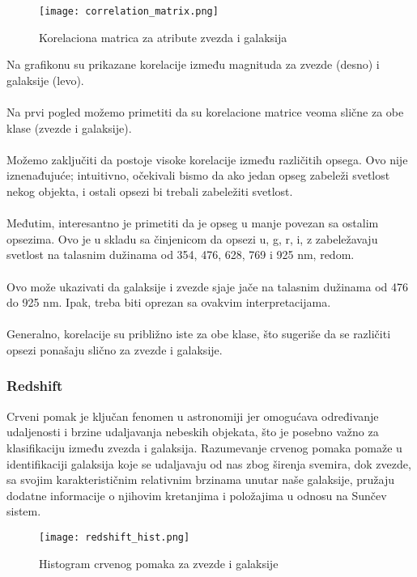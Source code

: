 \documentclass[a4paper,12pt]{article}
\begin{document}
\clearpage

\begin{figure}[h!]
\centering
\texttt{[image: correlation\_matrix.png]}
\caption{Korelaciona matrica za atribute zvezda i galaksija}
\label{fig:correlation_matrix}
\end{figure}

Na grafikonu su prikazane korelacije između magnituda za zvezde (desno) i galaksije (levo).
\\\\Na prvi pogled možemo primetiti da su korelacione matrice veoma slične za obe klase (zvezde i galaksije).
\\\\Možemo zaključiti da postoje visoke korelacije između različitih opsega. Ovo nije iznenađujuće; intuitivno, očekivali bismo da ako jedan opseg zabeleži svetlost nekog objekta, i ostali opsezi bi trebali zabeležiti svetlost.
\\\\Međutim, interesantno je primetiti da je opseg u manje povezan sa ostalim opsezima. Ovo je u skladu sa činjenicom da opsezi u, g, r, i, z zabeležavaju svetlost na talasnim dužinama od 354, 476, 628, 769 i 925 nm, redom.
\\\\Ovo može ukazivati da galaksije i zvezde sjaje jače na talasnim dužinama od 476 do 925 nm. Ipak, treba biti oprezan sa ovakvim interpretacijama.
\\\\Generalno, korelacije su približno iste za obe klase, što sugeriše da se različiti opsezi ponašaju slično za zvezde i galaksije.


\subsubsection{Redshift}
Crveni pomak je ključan fenomen u astronomiji jer omogućava određivanje udaljenosti i brzine udaljavanja nebeskih objekata, što je posebno važno za klasifikaciju između zvezda i galaksija. Razumevanje crvenog pomaka pomaže u identifikaciji galaksija koje se udaljavaju od nas zbog širenja svemira, dok zvezde, sa svojim karakterističnim relativnim brzinama unutar naše galaksije, pružaju dodatne informacije o njihovim kretanjima i položajima u odnosu na Sunčev sistem.

\clearpage

\begin{figure}[h!]
\centering
\texttt{[image: redshift\_hist.png]}
\caption{Histogram crvenog pomaka za zvezde i galaksije}
\label{fig:redshift_hist}
\end{figure}
\end{document}
